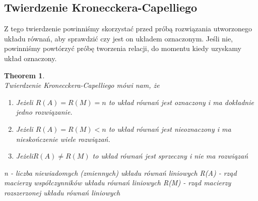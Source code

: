 \documentclass{article}
\newtheorem{theorem}{Theorem}
\begin{document}
\subsection{Twierdzenie Kronecckera-Capelliego}\label{tw KC}
Z tego twierdzenie powinniśmy skorzystać przed próbą rozwiązania utworzonego układu równań, aby sprawdzić czy jest on układem oznaczonym. Jeśli nie, powinniśmy powtórzyć próbę tworzenia relacji, do momentu kiedy uzyskamy układ oznaczony.
\begin{theorem}
\\
Twierdzenie Kronecckera-Capelliego mówi nam, że
\begin{enumerate}
    \item Jeżeli \begin{math}    R(A) = R(M) = n \end{math} to układ równań jest oznaczony i ma dokładnie jedno rozwiązanie.
    \item Jeżeli  \begin{math} R(A) = R(M) < n \end{math} to układ równań jest nieoznaczony i ma nieskończenie wiele rozwiązań.
    \item Jeżeli\begin{math} R(A) \neq R(M) \end{math} to układ równań jest  sprzeczny i nie ma rozwiązań
\end{enumerate}
n - liczba niewiadomych (zmiennych) układu równań liniowych
\newline
R(A) - rząd macierzy współczynników układu równań liniowych
\newline
R(M) - rząd macierzy rozszerzonej układu równań liniowych 
\end{theorem}
\end{document}
